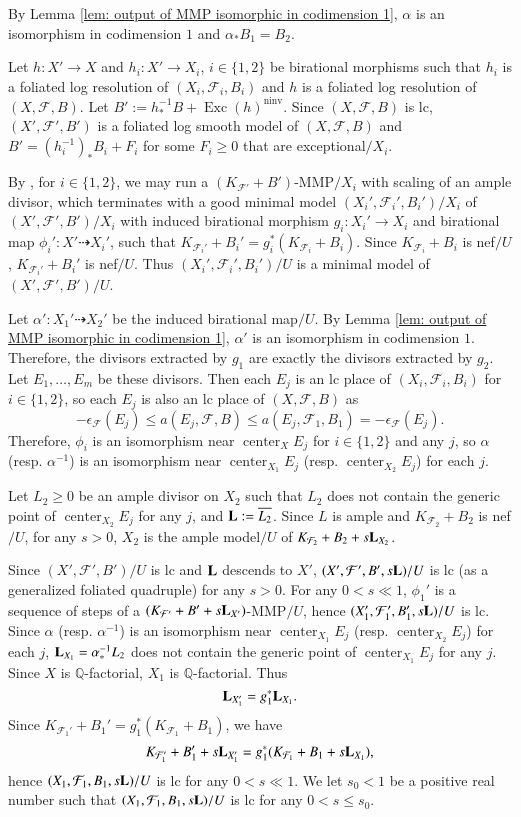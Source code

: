 \documentclass[preprint,12pt]{elsarticle}
\newcommand{\Qq}{\mathbb{Q}}
\newcommand{\Center}{\operatorname{center}}
\newcommand{\Exc}{\operatorname{Exc}}
\newcommand{\ninv}{{\operatorname{ninv}}}
\newcommand{\Ff}{\mathcal{F}}
\newcommand{\Ll}{{\bf{L}}}
\begin{document}
\begin{pf}
By Lemma \ref{lem: output of MMP isomorphic in codimension 1}, $\alpha$ is an isomorphism in codimension $1$ and $\alpha_*B_1=B_2$.

Let $h: X'\rightarrow X$ and $h_i: X'\rightarrow X_i$, $i\in\{1,2\}$ be birational morphisms such that $h_i$ is a foliated log resolution of $(X_i,\Ff_i,B_i)$ and $h$ is a foliated log resolution of $(X,\Ff,B)$. Let $B':=h^{-1}_*B+\Exc(h)^{\ninv}$. Since $(X,\Ff,B)$ is lc, $(X',\Ff',B')$ is a foliated log smooth model of $(X,\Ff,B)$ and $B'=(h_i^{-1})_*B_i+F_i$ for some $F_i\geq 0$ that are exceptional$/X_i$. 

By \cite[Lemma 4.13]{LMX24b}, for $i\in\{1,2\}$, we may run a $(K_{\Ff'}+B')$-MMP$/X_i$ with scaling of an ample divisor, which terminates with a good minimal model $(X_i',\Ff_i',B_i')/X_i$ of $(X',\Ff',B')/X_i$ with induced birational morphism $g_i: X_i'\rightarrow X_i$ and birational map $\phi_i': X'\dashrightarrow X_i'$, such that $K_{\Ff_i'}+B_i'=g_i^*(K_{\Ff_i}+B_i)$. Since $K_{\Ff_i}+B_i$ is nef$/U$, $K_{\Ff_i'}+B_i'$ is nef$/U$. Thus $(X_i',\Ff_i',B_i')/U$ is a minimal model of $(X',\Ff',B')/U$. 

Let $\alpha': X_1'\dashrightarrow X_2'$ be the induced birational map$/U$. By Lemma \ref{lem: output of MMP isomorphic in codimension 1}, $\alpha'$ is an isomorphism in codimension $1$. Therefore, the divisors extracted by $g_1$ are exactly the divisors extracted by $g_2$. Let $E_1,\dots,E_m$ be these divisors. Then each $E_j$ is an lc place of $(X_i,\Ff_i,B_i)$ for $i\in\{1,2\}$, so each $E_j$ is also an lc place of $(X,\Ff,B)$ as
$$-\epsilon_{\Ff}(E_j)\leq a(E_j,\Ff,B)\leq a(E_j,\Ff_1,B_1)=-\epsilon_{\Ff}(E_j).$$
Therefore, $\phi_i$ is an isomorphism near $\Center_XE_j$ for $i\in\{1,2\}$ and any $j$, so $\alpha$ (resp. $\alpha^{-1}$) is an isomorphism near $\Center_{X_1}E_j$ (resp. $\Center_{X_2}E_j$) for each $j$.

Let $L_2\geq 0$ be an ample divisor on $X_2$ such that $L_2$ does not contain the generic point of $\Center_{X_2}E_j$ for any $j$, and $\Ll:=\overline{L_2}$. Since $L$ is ample and $K_{\Ff_2}+B_2$ is nef$/U$, for any $s>0$, $X_2$ is the ample model$/U$ of $K_{\Ff_2}+B_2+s\Ll_{X_2}$. 

Since $(X',\Ff',B')/U$ is lc and $\Ll$ descends to $X'$, $(X',\Ff',B',s\Ll)/U$ is lc (as a generalized foliated quadruple) for any $s>0$. For any $0<s\ll 1$, $\phi_1'$ is a sequence of steps of a $(K_{\Ff'}+B'+s\Ll_{X'})$-MMP$/U$, hence $(X_1',\Ff_1',B_1',s\Ll)/U$ is lc. Since $\alpha$ (resp. $\alpha^{-1}$) is an isomorphism near $\Center_{X_1}E_j$ (resp. $\Center_{X_2}E_j$) for each $j$, $\Ll_{X_1}=\alpha^{-1}_{\ast}L_2$ does not contain the generic point of $\Center_{X_1}E_j$ for any $j$. Since $X$ is $\Qq$-factorial, $X_1$ is $\Qq$-factorial. Thus
$$\Ll_{X_1'}=g_1^*\Ll_{X_1}.$$
Since $K_{\Ff_1'}+B_1'=g_1^*(K_{\Ff_1}+B_1)$, we have
$$K_{\Ff_1'}+B_1'+s\Ll_{X_1'}=g_1^*(K_{\Ff_1}+B_1+s\Ll_{X_1}),$$
hence $(X_1,\Ff_1,B_1,s\Ll)/U$ is lc for any $0<s\ll 1$. We let $s_0<1$ be a positive real number such that  $(X_1,\Ff_1,B_1,s\Ll)/U$ is lc for any $0<s\leq s_0$.


\end{pf}
\end{document}

